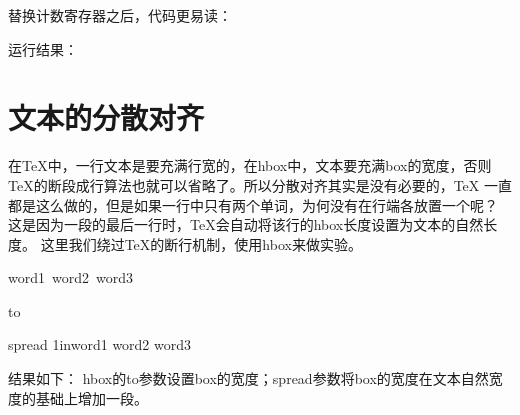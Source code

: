﻿\documentclass{article}
\begin{document}
  替换计数寄存器之后，代码更易读：


  运行结果：

  \section[文本的分散对齐]{文本的分散对齐}
  在\TeX{}中，一行文本是要充满行宽的，在hbox中，文本要充满box的宽度，否则
  \TeX{}的断段成行算法也就可以省略了。所以分散对齐其实是没有必要的，\TeX{}
  一直都是这么做的，但是如果一行中只有两个单词，为何没有在行端各放置一个呢？
  这是因为一段的最后一行时，\TeX{}会自动将该行的\bs hbox长度设置为文本的自然长度。
  这里我们绕过\TeX{}的断行机制，使用\bs hbox来做实验。\par
  \begin{latexcode}
\hbox{word1 word2 word3}\par
\hbox to \par
\hbox spread 1in{word1 word2 word3}
  \end{latexcode}

  结果如下：
  \bs hbox的to参数设置box的宽度；spread参数将box的宽度在文本自然宽度的基础上增加一段。
\end{document}
